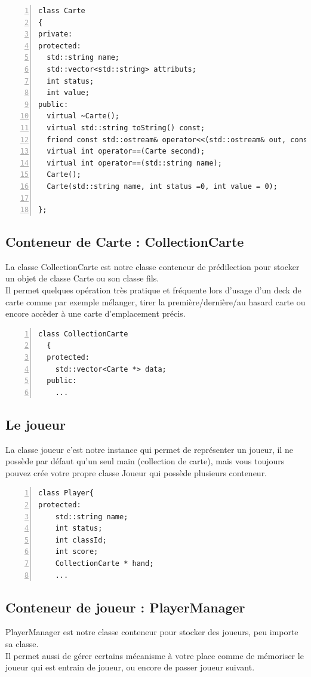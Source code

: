 \documentclass[12pt, letterpaper]{article}
\begin{document}
\begin{Verbatim}[numbers=left,xleftmargin = 5mm]
class Carte
{
private:
protected:
  std::string name;
  std::vector<std::string> attributs;
  int status;
  int value; 
public:
  virtual ~Carte();
  virtual std::string toString() const;
  friend const std::ostream& operator<<(std::ostream& out, const Carte& mat);
  virtual int operator==(Carte second);
  virtual int operator==(std::string name);
  Carte();
  Carte(std::string name, int status =0, int value = 0);

};
\end{Verbatim}

\subsection{Conteneur de Carte : CollectionCarte }
La classe CollectionCarte est notre classe conteneur de prédilection pour stocker un objet de classe Carte ou son classe fils.\\
Il permet quelques opération très pratique et fréquente lors d'usage d'un deck de carte comme par exemple mélanger, tirer la première/dernière/au hasard carte
ou encore accèder à une carte d'emplacement précis.

\begin{Verbatim}[numbers=left,xleftmargin = 5mm]
  class CollectionCarte
  {
  protected:
    std::vector<Carte *> data;
  public:
    ...
\end{Verbatim}
 
\subsection{Le joueur}
La classe joueur c'est notre instance qui permet de représenter un joueur, il ne possède par défaut qu'un seul main (collection de carte),
mais vous toujours pouvez crée votre propre classe Joueur qui possède plusieurs conteneur.

\begin{Verbatim}[numbers=left,xleftmargin = 5mm]
class Player{
protected:
    std::string name;
    int status;
    int classId;
    int score;
    CollectionCarte * hand;
    ...
\end{Verbatim} 

\subsection{Conteneur de joueur : PlayerManager}
PlayerManager est notre classe conteneur pour stocker des joueurs, peu importe sa classe.\\
Il permet aussi de gérer certains mécanisme à votre place comme de mémoriser le joueur qui est entrain de joueur, 
ou encore de passer joueur suivant.
\end{document}
